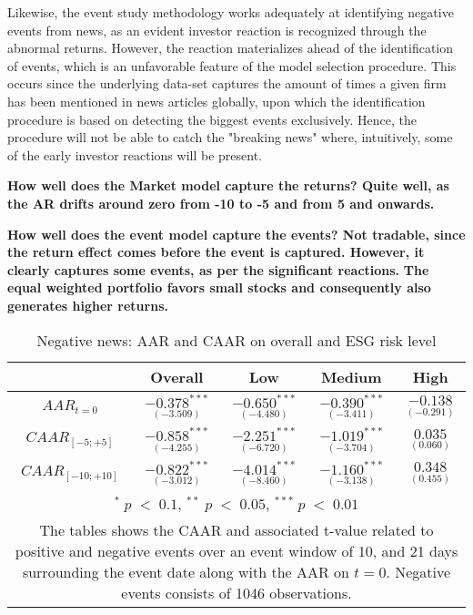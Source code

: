 Likewise, the event study methodology works adequately at identifying negative events from news, as an evident investor reaction is recognized through the abnormal returns. However, the reaction materializes ahead of the identification of events, which is an unfavorable feature of the model selection procedure. This occurs since the underlying data-set captures the amount of times a given firm has been mentioned in news articles globally, upon which the identification procedure is based on detecting the biggest events exclusively. Hence, the procedure will not be able to catch the "breaking news" where, intuitively, some of the early investor reactions will be present.  


\textbf{How well does the Market model capture the returns? Quite well, as the AR drifts around zero from -10 to -5 and from 5 and onwards. }

\textbf{How well does the event model capture the events? Not tradable, since the return effect comes before the event is captured. However, it clearly captures some events, as per the significant reactions. }
\textbf{The equal weighted portfolio favors small stocks and consequently also generates higher returns. }


\begin{table}[H]
\centering
\caption{Negative news: AAR and CAAR on overall and ESG risk level} 
\begin{tabular}{ccccc}
  \hline  \hline
  & \multicolumn{1}{c}{Overall} &  \multicolumn{1}{c}{Low} & \multicolumn{1}{c}{Medium} & \multicolumn{1}{c}{High}\\  
 \hline
$AAR_{t=0}$ &   $\underset{(-3.509)}{-0.378^{***}}$ &   $\underset{(-4.480)}{-0.650^{***}}$ &   $\underset{(-3.411)}{-0.390^{***}}$ &   $\underset{(-0.291)}{-0.138 }$ \\

$CAAR_{[-5;+5]}$  &  $\underset{(-4.255)}{-0.858^{***}}$ &   $\underset{(-6.720)}{-2.251^{***}}$ &   $\underset{(-3.704)}{-1.019^{***}}$ &   $\underset{(0.060)}{0.035}$ \\ 

$CAAR_{[-10;+10]}$    & $\underset{(-3.012)}{-0.822^{***}}$ &   $\underset{(-8.460)}{-4.014^{***}}$ &   $\underset{(-3.138)}{-1.160^{***}}$ &   $\underset{(0.455)}{0.348}$ \\ 
   \hline \hline
   \multicolumn{5}{p{12cm}}{ \footnotesize $^* \; p\; <\; 0.1$, $ ^{**} \; p\; <\; 0.05$, $ ^{***} \; p\; <\; 0.01$  } \\
   \multicolumn{5}{p{13cm}}{\footnotesize The tables shows the CAAR and associated t-value related to positive and negative events over an event window of 10, and 21 days surrounding the event date along with the AAR on $t=0$. Negative events consists of 1046 observations. } \\
   \hline
\end{tabular}
\label{tab: ST_neg_significance}
\end{table}


